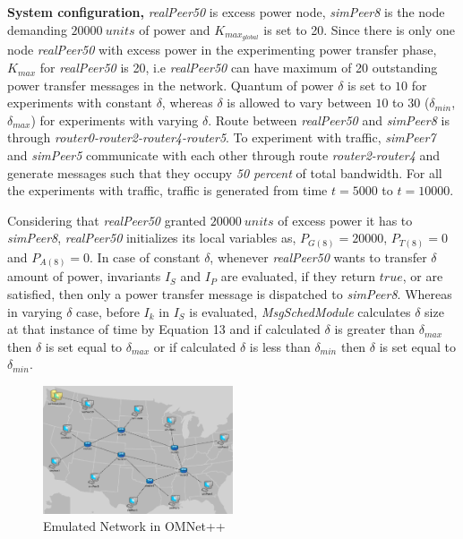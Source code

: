 {\bf System configuration, }\textit{realPeer50} is excess power node, \textit{simPeer8} is the node demanding $20000~units$ of power and $K_{max_{global}}$ is set to 20. Since there is only one node \textit{realPeer50} with excess power in the experimenting power transfer phase, $K_{max}$ for \textit{realPeer50} is 20, i.e \textit{realPeer50} can have maximum of 20 outstanding power transfer messages in the network. Quantum of power $\delta$ is set to $10$ for experiments with constant $\delta$, whereas $\delta$ is allowed to vary between $10$ to $30$ ($\delta_{min}$, $\delta_{max}$) for experiments with varying $\delta$. Route between \textit{realPeer50} and \textit{simPeer8} is through \textit{router0-router2-router4-router5}. To experiment with traffic, \textit{simPeer7} and \textit{simPeer5} communicate with each other through route \textit{router2-router4} and generate messages such that
they occupy \textit{50 percent} of total bandwidth. For all the experiments with traffic, traffic is generated from time $t=5000$ to $t=10000$. 

Considering that \textit{realPeer50} granted $20000~units$ of excess power it has to \textit{simPeer8}, \textit{realPeer50} initializes its local variables as, $P_{G(8)}=20000$, $P_{T(8)}=0$ and $P_{A(8)}=0$. In case of constant $\delta$, whenever \textit{realPeer50} wants to transfer $\delta$ amount of power, invariants $I_S$ and $I_P$ are evaluated, if they return $true$, or are satisfied, then only a power transfer message is dispatched to \textit{simPeer8}. Whereas in varying $\delta$ case, before $I_k$ in $I_S$ is evaluated, \textit{MsgSchedModule} calculates $\delta$ size at that instance of time by Equation 13 and if calculated $\delta$ is greater than $\delta_{max}$ then $\delta$ is set equal to $\delta_{max}$ or if calculated $\delta$ is less than $\delta_{min}$ then $\delta$ is set equal to $\delta_{min}$.

\begin{figure}[htb]
  \begin{center}
    \includegraphics[width=0.50\textwidth]{Figures/iccps2014/dgi_net.png}
  \caption{Emulated Network in OMNet++}
  \label{fig:dgi_net}
  \end{center}
\end{figure}

